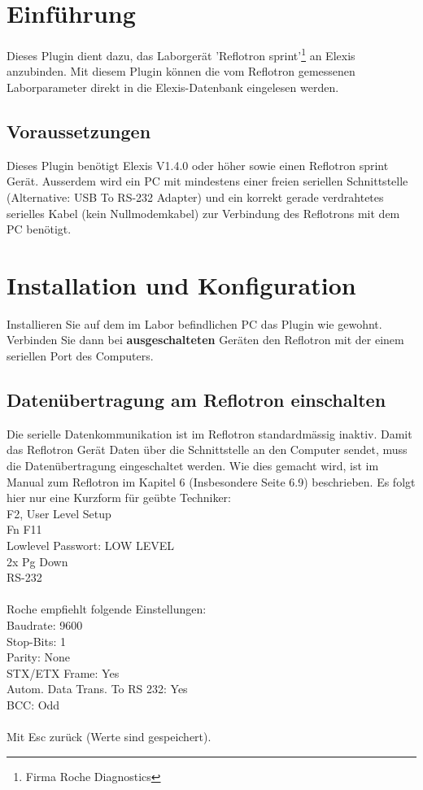 \documentclass[a4paper]{scrartcl}
\begin{document}
\section{Einführung}
Dieses Plugin dient dazu, das Laborger\"at 'Reflotron sprint'\footnote{Firma Roche Diagnostics} an Elexis anzubinden. Mit diesem Plugin k\"onnen die vom Reflotron gemessenen Laborparameter direkt in die Elexis-Datenbank eingelesen werden.

\subsection{Voraussetzungen}
Dieses Plugin ben\"otigt Elexis V1.4.0 oder h\"oher sowie einen Reflotron sprint Ger\"at. Ausserdem wird ein PC mit mindestens einer freien seriellen Schnittstelle (Alternative: USB To RS-232 Adapter) und ein korrekt gerade verdrahtetes serielles Kabel (kein Nullmodemkabel) zur Verbindung des Reflotrons mit dem PC ben\"otigt.

\section{Installation und Konfiguration}
Installieren Sie auf dem im Labor befindlichen PC das Plugin wie gewohnt. Verbinden Sie dann bei \textbf{ausgeschalteten} Ger\"aten den Reflotron mit der einem seriellen Port des Computers. 
\subsection{Daten\"ubertragung am Reflotron einschalten}
Die serielle Datenkommunikation ist im Reflotron standardm\"assig inaktiv. Damit das Reflotron Ger\"at Daten \"uber die Schnittstelle an den Computer sendet, muss die Daten\"ubertragung eingeschaltet werden. Wie dies gemacht wird, ist im Manual zum Reflotron im Kapitel 6 (Insbesondere Seite 6.9) beschrieben. Es folgt hier nur eine Kurzform f\"ur ge\"ubte Techniker:\\
F2, User Level Setup\\
Fn F11\\
Lowlevel Passwort: LOW LEVEL\\
2x Pg Down\\
RS-232\\
\\
Roche empfiehlt folgende Einstellungen:\\
Baudrate: 9600\\
Stop-Bits: 1\\
Parity: None\\
STX/ETX Frame: Yes\\
Autom. Data Trans. To RS 232: Yes\\
BCC: Odd\\
\\
Mit Esc zur\"uck (Werte sind gespeichert).
\end{document}
